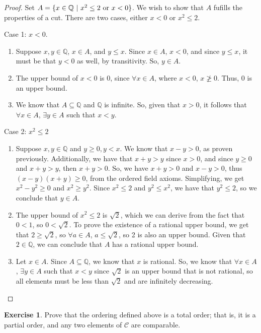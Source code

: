 \documentclass{article}
\theoremstyle{definition}
\newtheorem{exercise}{Exercise}
\newcommand{\Q}{\mathbb{Q}}
\begin{document}
\begin{proof}
 Set $A = \{x\in \Q\ | \ x^2\leq 2\hbox{ or } x<0\}$. We wish to show that $A$ fufills the properties of a cut. There are two cases, either $x < 0$ or $x^2\leq 2$. 

Case 1: $x < 0$. 
\begin{enumerate}
\item Suppose $x, y \in \Q$,  $x \in A$, and $y \leq x$.  Since $x \in A$, $x < 0$, and since $y \leq x$, it must be that $y < 0$ as well, by transitivity. So, $y \in A$.
\item The upper bound of $x < 0$ is 0, since $\forall x \in A$, where $x < 0$, $x \ngeq 0$. Thus, 0 is an upper bound.
\item We know that $A \subseteq \Q$ and $\Q$ is infinite. So, given that $x > 0$, it follows that $\forall x \in A$, $\exists y \in A$ such that $x < y$. 
\end{enumerate}

Case 2: $x^2\leq 2$
\begin{enumerate}
\item Suppose $x, y \in \Q$ and $y \geq 0, y < x$. We know that $x - y > 0$, as proven previously. Additionally, we have that $x + y > y$ since $x > 0$, and since $y \geq 0$ and $x + y > y$, then $x + y > 0$. So, we have $x + y > 0$ and $x - y > 0$, thus $(x - y)(x + y) \geq 0$, from the ordered field axioms. Simplifying, we get $x^2 - y^2 \geq 0$ and $x^2 \geq y^2$. Since $x^2 \leq 2$ and $y^2 \leq x^2$, we have that $y^2 \leq 2$, so we conclude that $y \in A$. 
\item The upper bound of $x^2 \leq 2$ is $\sqrt{2}$, which we can derive from the fact that $0 < 1$, so $0 < \sqrt{2}$. To prove the existence of a rational upper bound, we get that $2 \geq \sqrt{2}$, so $\forall a \in A$, $a \leq \sqrt{2}$, so 2 is also an upper bound. Given that $2 \in \Q$, we can conclude that $A$ has a rational upper bound.  
\item Let $x \in A$. Since $A \subseteq \Q$, we know that $x$ is rational. So, we know that $\forall x \in A$, $\exists y \in A$ such that $x < y$ since $\sqrt{2}$ is an upper bound that is not rational, so all elements must be less than $\sqrt{2}$ and are infinitely decreasing. 
\end{enumerate}

\end{proof}

\begin{exercise}
Prove that the ordering defined above is a total order; that is, it is a partial order, and any two elements of $\mathcal{C}$ are comparable.
\end{exercise}
\end{document}

